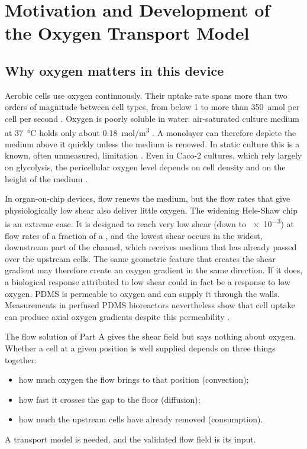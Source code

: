 \chapter{Motivation and Development of the Oxygen Transport Model}
\label{ch:o2motivation}

\section{Why oxygen matters in this device}

Aerobic cells use oxygen continuously. Their uptake rate spans more than two orders of magnitude between cell types, from below 1 to more than \SI{350}{amol} per cell per second \citep{Wagner2011}. Oxygen is poorly soluble in water: air-saturated culture medium at \SI{37}{\celsius} holds only about \SI{0.18}{mol/m^3} \citep{Wenger2015}. A monolayer can therefore deplete the medium above it quickly unless the medium is renewed. In static culture this is a known, often unmeasured, limitation \citep{Place2017}. Even in Caco-2 cultures, which rely largely on glycolysis, the pericellular oxygen level depends on cell density and on the height of the medium \citep{Zeitouni2015}.

In organ-on-chip devices, flow renews the medium, but the flow rates that give physiologically low shear also deliver little oxygen. The widening Hele-Shaw chip is an extreme case. It is designed to reach very low shear (down to \SI{e-3}{\dyncm}) at flow rates of a fraction of a \ulmin, and the lowest shear occurs in the widest, downstream part of the channel, which receives medium that has already passed over the upstream cells. The same geometric feature that creates the shear gradient may therefore create an oxygen gradient in the same direction. If it does, a biological response attributed to low shear could in fact be a response to low oxygen. PDMS is permeable to oxygen and can supply it through the walls. Measurements in perfused PDMS bioreactors nevertheless show that cell uptake can produce axial oxygen gradients despite this permeability \citep{Mehta2007}.

The flow solution of Part A gives the shear field but says nothing about oxygen. Whether a cell at a given position is well supplied depends on three things together:
\begin{itemize}
\item how much oxygen the flow brings to that position (convection);
\item how fast it crosses the gap to the floor (diffusion);
\item how much the upstream cells have already removed (consumption).
\end{itemize}
A transport model is needed, and the validated flow field is its input.

